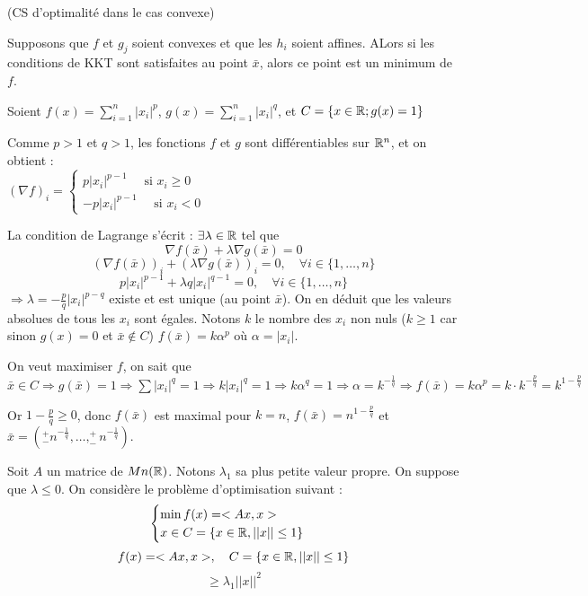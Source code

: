 \begin{theoreme} (CS d'optimalité dans le cas convexe)

Supposons que $f$ et $g_j$ soient convexes et que les $h_i$ soient affines. ALors si les conditions de KKT sont satisfaites au point $\bar{x}$, alors ce point est un minimum de $f$.
\end{theoreme}
\begin{exemple} %

	Soient $ \displaystyle f(x) = \sum_{i=1}^n |x_i|^p $, 
	$ \displaystyle g(x) = \sum_{i=1}^n |x_i|^q $, et
	$ \displaystyle C = \{ x \in \mathbb{R} ; g(x) = 1 \} $
	
	
	Comme $p>1$ et $q>1$, les fonctions $f$ et $g$ sont différentiables sur $\mathbb{R}^n$, et on obtient :\\ $\displaystyle (\nabla f)_i = \begin{cases} p |x_i|^{p-1} \quad \text{ si }x_i\geq 0 \\  -p |x_i|^{p-1} \quad \text{ si } x_i < 0  \end{cases}$ 
	
	La condition de Lagrange s'écrit : $\exists \lambda \in \mathbb{R}$ tel que 
	\[ \nabla f(\bar{x}) + \lambda \nabla g(\bar{x}) = 0 \]
	\[ (\nabla f(\bar{x}))_i + (\lambda \nabla g(\bar{x}))_i = 0 , \quad \forall i \in \{ 1, \dots, n \} \]
	\[ p|x_i|^{p-1} + \lambda q|x_i|^{q-1} = 0 , \quad \forall i \in \{ 1, \dots, n \} \]
	$ \Rightarrow \lambda = - \frac{p}{q}|x_i|^{p-q} $ existe et est unique (au point $\bar{x}$). On en déduit que les valeurs absolues de tous les $x_i$ sont égales.
	Notons $k$ le nombre des $x_i$ non nuls ($k \geq 1$ car sinon $g(x) = 0$ et $\bar{x} \not \in C$)
	$f(\bar{x}) = k \alpha ^p$ où $\alpha = |x_i|$.
	
	On veut maximiser $f$, on sait que $\bar{x} \in C \Rightarrow g(\bar{x}) = 1 \Rightarrow \sum |x_i|^q = 1 \Rightarrow k |x_i|^q = 1 \Rightarrow k \alpha^q = 1 \Rightarrow \alpha = k^{-\frac{1}{q}} \Rightarrow f(\bar{x}) = k \alpha^p = k \cdot k^{-\frac{p}{q}} = k^{1-\frac{p}{q}} $
	
	Or $1-\frac{p}{q} \geq 0$, donc $f(\bar{x})$ est maximal pour $k=n$, $f(\bar{x}) = n^{1-\frac{p}{q}}$ et $\bar{x} = (^+_- n^{-\frac{1}{q}}, \dots, ^+_- n^{-\frac{1}{q}})$.
	
\end{exemple}

\begin{exemple} %
	Soit $A$ un matrice de $Mn(\mathbb{R})$. Notons $\lambda _1$ sa plus petite valeur propre. On suppose que $\lambda \leq 0$. On considère le problème d'optimisation suivant : \[ \begin{cases}\min f(x) = <Ax, x> \\ x \in C = \{ x \in \mathbb{R}, ||x|| \leq 1 \} \end{cases} \]
	\[f(x) = <Ax, x>, \quad C = \{ x\in \mathbb{R}, ||x|| \leq 1 \} \]
	\[<Ax, a> \geq \lambda _1 ||x||^2 \]
	
\end{exemple}

	

 






